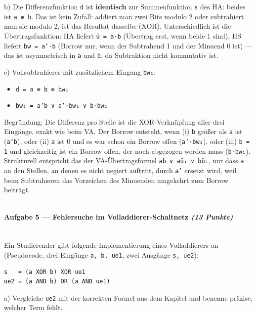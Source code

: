 \documentclass[11pt, a4paper]{article}
\begin{document}
b) Die Differenzfunktion \texttt{d} ist \textbf{identisch} zur Summenfunktion \texttt{s} des HA: beides ist \texttt{a ⊕ b}. Das ist kein Zufall: addiert man zwei Bits modulo 2 oder subtrahiert man sie modulo 2, ist das Resultat dasselbe (XOR). Unterschiedlich ist die Übertragsfunktion: HA liefert \texttt{ü = a·b} (Übertrag erst, wenn beide 1 sind), HS liefert \texttt{bw = a'·b} (Borrow nur, wenn der Subtrahend 1 und der Minuend 0 ist) — das ist asymmetrisch in \texttt{a} und \texttt{b}, da Subtraktion nicht kommutativ ist.


c) Vollsubtrahierer mit zusätzlichem Eingang \texttt{bw₁}:


\begin{itemize}
  \item \texttt{d = a ⊕ b ⊕ bw₁}
  \item \texttt{bw₂ = a'b ∨ a'·bw₁ ∨ b·bw₁}
\end{itemize}

Begründung: Die Differenz pro Stelle ist die XOR-Verknüpfung aller drei Eingänge, exakt wie beim VA. Der Borrow entsteht, wenn (i) \texttt{b} größer als \texttt{a} ist (\texttt{a'b}), oder (ii) \texttt{a} ist 0 und es war schon ein Borrow offen (\texttt{a'·bw₁}), oder (iii) \texttt{b = 1} und gleichzeitig ist ein Borrow offen, der noch abgezogen werden muss (\texttt{b·bw₁}). Strukturell entspricht das der VA-Übertragsformel \texttt{ab ∨ aü₁ ∨ bü₁}, nur dass \texttt{a} an den Stellen, an denen es nicht negiert auftritt, durch \texttt{a'} ersetzt wird, weil beim Subtrahieren das Vorzeichen des Minuenden umgekehrt zum Borrow beiträgt.



\noindent\textcolor{rulegray}{\rule{\linewidth}{0.4pt}}


\paragraph{Aufgabe 5 — Fehlersuche im Volladdierer-Schaltnetz \textit{(13 Punkte)}}\mbox{}\\[2pt]

Ein Studierender gibt folgende Implementierung eines Volladdierers an (Pseudocode, drei Eingänge \texttt{a, b, ue1}, zwei Ausgänge \texttt{s, ue2}):


\begin{lstlisting}
s   = (a XOR b) XOR ue1
ue2 = (a AND b) OR (a AND ue1)
\end{lstlisting}


a) Vergleiche \texttt{ue2} mit der korrekten Formel aus dem Kapitel und benenne präzise, welcher Term fehlt.
\end{document}
